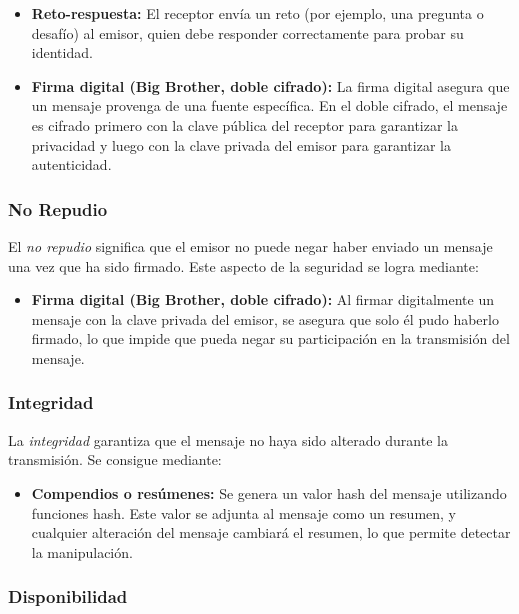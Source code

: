 \documentclass[a4paper,12pt]{article}
\begin{document}
\begin{itemize}
    \item \textbf{Reto-respuesta:} El receptor envía un reto (por ejemplo, una pregunta o desafío) al emisor, quien debe responder correctamente para probar su identidad.
    \item \textbf{Firma digital (Big Brother, doble cifrado):} La firma digital asegura que un mensaje provenga de una fuente específica. En el doble cifrado, el mensaje es cifrado primero con la clave pública del receptor para garantizar la privacidad y luego con la clave privada del emisor para garantizar la autenticidad.
\end{itemize}

\subsubsection{No Repudio}

El \textit{no repudio} significa que el emisor no puede negar haber enviado un mensaje una vez que ha sido firmado. Este aspecto de la seguridad se logra mediante:

\begin{itemize}
    \item \textbf{Firma digital (Big Brother, doble cifrado):} Al firmar digitalmente un mensaje con la clave privada del emisor, se asegura que solo él pudo haberlo firmado, lo que impide que pueda negar su participación en la transmisión del mensaje.
\end{itemize}

\subsubsection{Integridad}

La \textit{integridad} garantiza que el mensaje no haya sido alterado durante la transmisión. Se consigue mediante:

\begin{itemize}
    \item \textbf{Compendios o resúmenes:} Se genera un valor hash del mensaje utilizando funciones hash. Este valor se adjunta al mensaje como un resumen, y cualquier alteración del mensaje cambiará el resumen, lo que permite detectar la manipulación.
\end{itemize}

\subsubsection{Disponibilidad}
\end{document}
